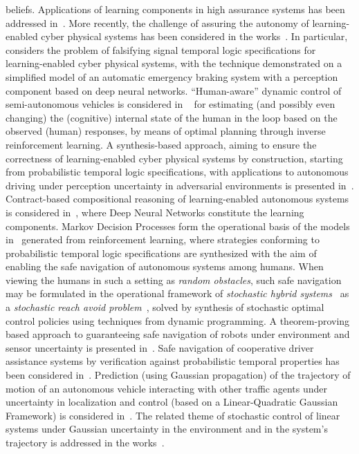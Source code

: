 {beliefs}. Applications of learning components in high assurance systems has been addressed in~\cite{Schumann}. More recently, the challenge of assuring the autonomy of learning-enabled cyber physical systems has been considered in the works~\cite{SeshiaNFM17,SeshiaSadigh18a,SeshiaSasdigh18b,Corina18}. In particular, \cite{SeshiaNFM17} considers the problem of falsifying signal temporal logic specifications for learning-enabled cyber physical systems, with the technique demonstrated on a simplified model of an automatic emergency braking system with a perception component based on deep neural networks. ``Human-aware'' dynamic control of semi-autonomous vehicles is considered in ~\cite{SeshiaSadigh18a} for estimating (and possibly even changing) the (cognitive) internal state of the human in the loop based on the observed (human) responses, by means of optimal planning through inverse reinforcement learning. A synthesis-based approach, aiming to ensure the correctness of learning-enabled cyber physical systems by construction, starting from probabilistic temporal logic specifications, with applications to autonomous driving under perception uncertainty in adversarial  environments is presented in~\cite{SeshiaSasdigh18b}. Contract-based compositional reasoning of learning-enabled autonomous systems is considered in~\cite{Corina18}, where Deep Neural Networks constitute the learning components.  Markov Decision Processes form the operational basis of the models in~\cite{Topcu18} generated from reinforcement learning, where strategies conforming to probabilistic temporal logic specifications are synthesized with the aim of enabling the safe navigation of autonomous systems among humans. When viewing the humans in such a setting as \emph{random obstacles}, such safe navigation may be formulated in the operational framework of \emph{stochastic hybrid systems}~\cite{LygerosPrandiniSHS,FraenzleProcosSHS} as a \emph{stochastic reach avoid problem}~\cite{TomlinHSCC2011}, solved by synthesis of stochastic optimal control policies using techniques from dynamic programming. A theorem-proving based approach to guaranteeing safe navigation of robots under environment and sensor uncertainty is presented in~\cite{Mitsch17}. Safe navigation of cooperative driver assistance systems by verification against probabilistic temporal properties has been considered in~\cite{DammMSCS13}. Prediction (using Gaussian propagation)  of the trajectory of motion of an autonomous vehicle  interacting with other traffic agents under uncertainty in localization and control (based on a Linear-Quadratic Gaussian Framework) is considered in~\cite{XuDolanICRA2014}. The related theme of stochastic control of linear systems under Gaussian uncertainty in the environment and in the system's trajectory is addressed in the works~\cite{VitusTomlinCDC2012,VitusTomlinCDC2013}. 







